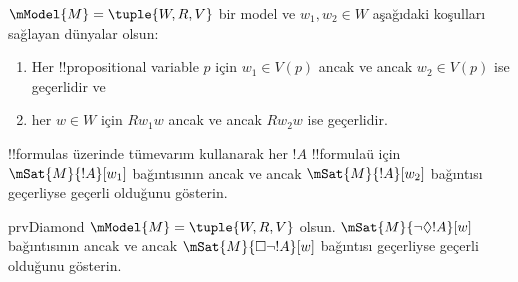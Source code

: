 \documentclass[../../../include/open-logic-section]{subfiles}
\begin{document}
\begin{prob}
  $\mModel{M} = \tuple{W, R, V}$ bir model ve $w_1, w_2 \in W$ aşağıdaki
  koşulları sağlayan dünyalar olsun:
  \begin{enumerate}
  \item Her !!{propositional variable} $p$ için $w_1 \in V(p)$ ancak ve
    ancak $w_2 \in V(p)$ ise geçerlidir ve
  \item her $w \in W$ için $Rw_1w$ ancak ve ancak $Rw_2w$ ise geçerlidir.
  \end{enumerate}
  !!{formula}s üzerinde tümevarım kullanarak her $!A$ !!{formula}{}ü için
  $\mSat{M}{!A}[w_1]$ bağıntısının ancak ve ancak $\mSat{M}{!A}[w_2]$
  bağıntısı geçerliyse geçerli olduğunu gösterin.
\end{prob}

\begin{probtag}{prvDiamond}
  $\mModel{M} = \tuple{W, R, V}$ olsun. $\mSat{M}{\lnot\Diamond !A}[w]$
  bağıntısının ancak ve ancak $\mSat{M}{\Box\lnot!A}[w]$ bağıntısı geçerliyse
  geçerli olduğunu gösterin.
\end{probtag}
\end{document}
